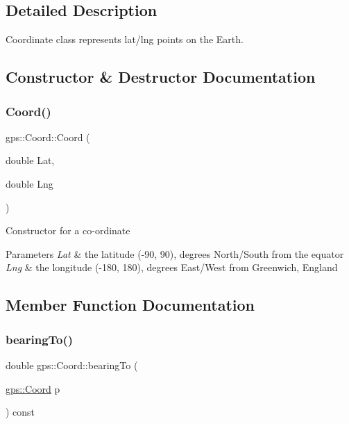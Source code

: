 \subsection{Detailed Description}
Coordinate class represents lat/lng points on the Earth. 

\subsection{Constructor \& Destructor Documentation}
\mbox{\label{classgps_1_1Coord_afcc45fae837b48cd7d9bd545c4dc574c}} 
\subsubsection{\texorpdfstring{Coord()}{Coord()}}
{\footnotesize\ttfamily gps\+::\+Coord\+::\+Coord (\begin{DoxyParamCaption}\item[{double}]{Lat,  }\item[{double}]{Lng }\end{DoxyParamCaption})}

Constructor for a co-\/ordinate 
\begin{DoxyParams}{Parameters}
{\em Lat} & the latitude (-\/90, 90), degrees North/\+South from the equator \\
\hline
{\em Lng} & the longitude (-\/180, 180), degrees East/\+West from Greenwich, England \\
\hline
\end{DoxyParams}


\subsection{Member Function Documentation}
\mbox{\label{classgps_1_1Coord_a304e6cb56296d8d945310d7b931fca4e}} 
\subsubsection{\texorpdfstring{bearing\+To()}{bearingTo()}}
{\footnotesize\ttfamily double gps\+::\+Coord\+::bearing\+To (\begin{DoxyParamCaption}\item[{\hyperlink{classgps_1_1Coord}{gps\+::\+Coord}}]{p }\end{DoxyParamCaption}) const}

